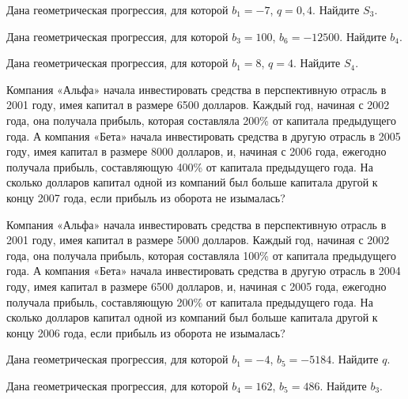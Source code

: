 \documentclass[4apaper]{article}
\begin{document}
\begin{taskBN}{1}
Дана геометрическая прогрессия, для которой $b_1 = -7$, $q=0,4$. Найдите $S_{3}$.
\end{taskBN}

\begin{taskBN}{2}
Дана геометрическая прогрессия, для которой $b_{3} = 100$, $b_{6}=-12500$. Найдите $b_{4}$.
\end{taskBN}

\begin{taskBN}{3}
Дана геометрическая прогрессия, для которой $b_1 = 8$, $q=4$. Найдите $S_{4}$.
\end{taskBN}

\begin{taskBN}{4}
Компания «Альфа» начала инвестировать средства в перспективную отрасль в 2001 году, имея капитал в размере 6500 долларов. Каждый год, начиная с 2002 года, она получала прибыль, которая составляла 200\% от капитала предыдущего года. А компания «Бета» начала инвестировать средства в другую отрасль в 2005 году, имея капитал в размере 8000 долларов, и, начиная с 2006 года, ежегодно получала прибыль, составляющую 400\% от капитала предыдущего года. На сколько долларов капитал одной из компаний был больше капитала другой к концу 2007 года, если прибыль из оборота не изымалась?
\end{taskBN}

\begin{taskBN}{5}
Компания «Альфа» начала инвестировать средства в перспективную отрасль в 2001 году, имея капитал в размере 5000 долларов. Каждый год, начиная с 2002 года, она получала прибыль, которая составляла 100\% от капитала предыдущего года. А компания «Бета» начала инвестировать средства в другую отрасль в 2004 году, имея капитал в размере 6500 долларов, и, начиная с 2005 года, ежегодно получала прибыль, составляющую 200\% от капитала предыдущего года. На сколько долларов капитал одной из компаний был больше капитала другой к концу 2006 года, если прибыль из оборота не изымалась?
\end{taskBN}

\begin{taskBN}{6}
Дана геометрическая прогрессия, для которой $b_1 = -4$, $b_{5}=-5184$. Найдите $q$.
\end{taskBN}

\begin{taskBN}{7}
Дана геометрическая прогрессия, для которой $b_{4} = 162$, $b_{5}=486$. Найдите $b_{3}$.
\end{taskBN}
\end{document}
